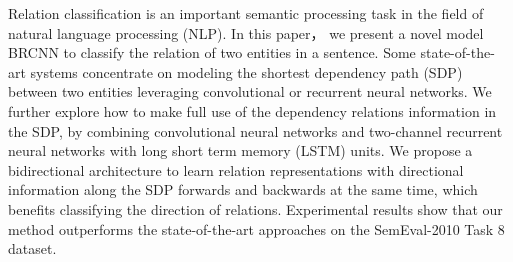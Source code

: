Relation classification is an important semantic processing task in the field of natural language processing (NLP). In this paper， we present a novel model BRCNN to classify the relation of two entities in a sentence. Some state-of-the-art systems concentrate on modeling the shortest dependency path (SDP) between two entities leveraging convolutional or recurrent neural networks. We further explore how to make full use of the dependency relations information in  the SDP,  by combining convolutional neural networks and two-channel recurrent neural networks with long short term memory (LSTM) units. We propose a bidirectional architecture to learn relation representations with directional information along the SDP forwards and backwards at the same time, which benefits classifying the direction of relations. Experimental results show that our method outperforms the state-of-the-art approaches on the SemEval-2010 Task 8 dataset.
